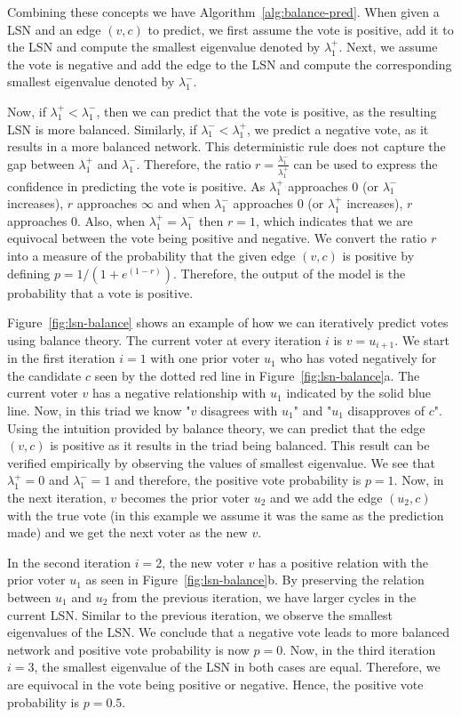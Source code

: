 Combining these concepts we have Algorithm~\ref{alg:balance-pred}.
When given a LSN and an edge $(v,c)$ to predict, we first assume the vote is positive, add it to the LSN and compute the smallest eigenvalue denoted by $\lambda_1^{+}$.
Next, we assume the vote is negative and add the edge to the LSN and compute the corresponding smallest eigenvalue denoted by $\lambda_1^-$.

Now, if $\lambda_1^+ < \lambda_1^-$, then we can predict that the vote is positive, as the resulting LSN is more balanced.
Similarly, if $\lambda_1^-<\lambda_1^+$, we predict a negative vote, as it results in a more balanced network.
This deterministic rule does not capture the gap between $\lambda_1^+$ and $\lambda_1^-$.
Therefore, the ratio $r=\frac{\lambda_1^-}{\lambda_1^+}$ can be used to express the confidence in predicting the vote is positive.
As $\lambda_1^+$ approaches $0$ (or $\lambda_1^-$ increases), $r$ approaches $\infty$ and when $\lambda_1^-$ approaches $0$ (or $\lambda_1^+$ increases), $r$ approaches $0$.
Also, when $\lambda_1^+=\lambda_1^-$ then $r=1$, which indicates that we are equivocal between the vote being positive and negative.
We convert the ratio $r$ into a measure of the probability that the given edge $(v,c)$ is positive by defining $p=1/(1+e^{(1-r)})$.
Therefore, the output of the model is the probability that a vote is positive.

Figure~\ref{fig:lsn-balance} shows an example of how we can iteratively predict votes using balance theory.
The current voter at every iteration $i$ is $v=u_{i+1}$.
We start in the first iteration $i=1$ with one prior voter $u_1$ who has voted negatively for the candidate $c$ seen by the dotted red line in Figure~\ref{fig:lsn-balance}a.
The current voter $v$ has a negative relationship with $u_1$ indicated by the solid blue line.
Now, in this triad we know "$v$ disagrees with $u_1$" and "$u_1$ disapproves of $c$".
Using the intuition provided by balance theory, we can predict that the edge $(v,c)$ is positive as it results in the triad being balanced.
This result can be verified empirically by observing the values of smallest eigenvalue.
We see that $\lambda_1^+=0$ and $\lambda_1^-=1$ and therefore, the positive vote probability is $p=1$.
Now, in the next iteration, $v$ becomes the prior voter $u_2$ and we add the edge $(u_2,c)$ with the true vote (in this example we assume it was the same as the prediction made) and we get the next voter as the new $v$.

In the second iteration $i=2$, the new voter $v$ has a positive relation with the prior voter $u_1$ as seen in Figure~\ref{fig:lsn-balance}b.
By preserving the relation between $u_1$ and $u_2$ from the previous iteration, we have larger cycles in the current LSN.
Similar to the previous iteration, we observe the smallest eigenvalues of the LSN.
We conclude that a negative vote leads to more balanced network and positive vote probability is now $p=0$.
Now, in the third iteration $i=3$, the smallest eigenvalue of the LSN in both cases are equal.
Therefore, we are equivocal in the vote being positive or negative.
Hence, the positive vote probability is $p=0.5$.

